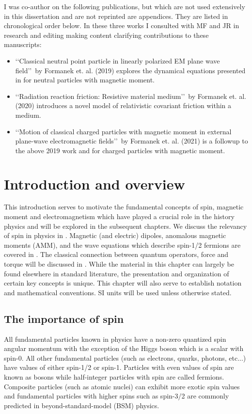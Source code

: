 I was co-author on the following publications, but which are not used extensively in this dissertation and are not reprinted are appendices. They are listed in chronological order below. In these three works I consulted with MF and JR in research and editing making content clarifying contributions to these manuscripts:
\begin{itemize}
    \item \lq\lq Classical neutral point particle in linearly polarized EM plane wave field\rq\rq\ by Formanek et. al. (2019) explores the dynamical equations presented in  for neutral particles with magnetic moment.
    \item \lq\lq Radiation reaction friction: Resistive material medium\rq\rq\ by Formanek et. al. (2020) introduces a novel model of relativistic covariant friction within a medium.
    \item \lq\lq Motion of classical charged particles with magnetic moment in external plane-wave electromagnetic fields\rq\rq\ by Formanek et. al. (2021) is a followup to the above 2019 work and  for charged particles with magnetic moment.
\end{itemize}

\chapter{Introduction and overview}
\label{chap:intro}
This introduction serves to motivate the fundamental concepts of spin, magnetic moment and electromagnetism which have played a crucial role in the history physics and will be explored in the subsequent chapters. We discuss the relevancy of spin in physics in . Magnetic (and electric) dipoles, anomalous magnetic moments (AMM), and the wave equations which describe spin-1/2 fermions are covered in . The classical connection between quantum operators, force and torque will be discussed in . While the material in this chapter can largely be found elsewhere in standard literature, the presentation and organization of certain key concepts is unique. This chapter will also serve to establish notation and mathematical conventions. SI units will be used unless otherwise stated.

\section{The importance of spin}
\label{sec:qspin}
\noindent All fundamental particles known in physics have a non-zero quantized spin angular momentum with the exception of the Higgs boson which is a scalar with spin-0. All other fundamental particles (such as electrons, quarks, photons, etc...) have values of either spin-1/2 or spin-1. Particles with even values of spin are known as bosons while half-integer particles with spin are called fermions. Composite particles (such as atomic nuclei) can exhibit more exotic spin values and fundamental particles with higher spins such as spin-3/2 are commonly predicted in beyond-standard-model (BSM) physics.

